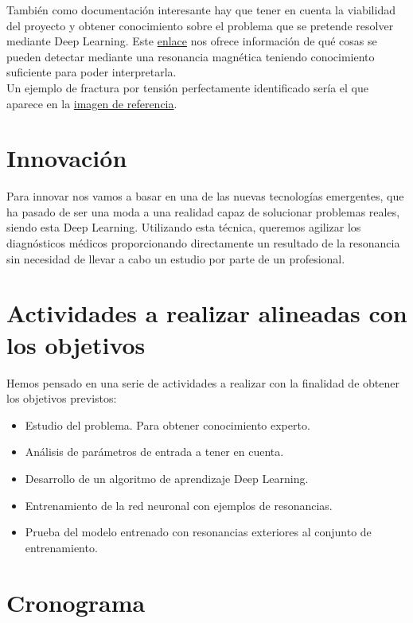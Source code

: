 \documentclass[a4paper,12pt,oneside]{article}
\begin{document}
También como documentación interesante hay que tener en cuenta la viabilidad del proyecto y obtener conocimiento sobre el problema que se pretende resolver mediante Deep Learning. Este \href{https://blog.hospitalsanangelinn.mx/resonancia-magnetica-diagnostico}{enlace} nos ofrece información de qué cosas se pueden detectar mediante una resonancia magnética teniendo conocimiento suficiente para poder interpretarla. \\

Un ejemplo de fractura por tensión perfectamente identificado sería el que aparece en la \href{https://www.google.es/search?q=resonancia+magnetica+con+fractura&source=lnms&tbm=isch&sa=X&ved=0ahUKEwj_ydaisK7eAhVDgRoKHeGoDsUQ_AUIDigB&biw=1536&bih=754#imgrc=5wcLStUv22LjAM:}{imagen de referencia}.

\section{Innovación}

Para innovar nos vamos a basar en una de las nuevas tecnologías emergentes, que ha pasado de ser una moda a una realidad capaz de solucionar problemas reales, siendo esta Deep Learning. Utilizando esta técnica, queremos agilizar los diagnósticos médicos proporcionando directamente un resultado de la resonancia sin necesidad de llevar a cabo un estudio por parte de un profesional.

\section{Actividades a realizar alineadas con los objetivos}

Hemos pensado en una serie de actividades a realizar con la finalidad de obtener los objetivos previstos:

\begin{itemize}
	\item Estudio del problema. Para obtener conocimiento experto.
	\item Análisis de parámetros de entrada a tener en cuenta.
	\item Desarrollo de un algoritmo de aprendizaje Deep Learning.
	\item Entrenamiento de la red neuronal con ejemplos de resonancias.
	\item Prueba del modelo entrenado con resonancias exteriores al conjunto de entrenamiento.
\end{itemize}

\section{Cronograma}
\end{document}
